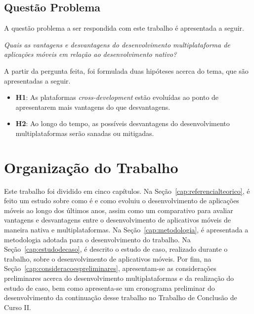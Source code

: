 \subsection{Questão Problema} \label{sec:questaoproblema}

A questão problema a ser respondida com este trabalho é apresentada a seguir.

\begin{center}
    \textit{Quais as vantagens e desvantagens do desenvolvimento multiplataforma de aplicações móveis em relação ao desenvolvimento nativo?}
\end{center}

A partir da pergunta feita, foi formulada duas hipóteses acerca do tema, que são apresentadas a seguir.

\begin{itemize}
    \item \textbf{H1}: As plataformas \textit{cross-development} estão evoluídas ao ponto de apresentarem mais vantagens do que desvantagens.
    \item \textbf{H2}: Ao longo do tempo, as possíveis desvantagens do desenvolvimento multiplataformas serão sanadas ou mitigadas.
\end{itemize}

\section{Organização do Trabalho}\label{sec:organizacao}

Este trabalho foi dividido em cinco capítulos. %
Na Seção~\ref{cap:referencialteorico}, é feito um estudo sobre como é e como evoluiu o desenvolvimento de aplicações 
móveis ao longo dos últimos anos, assim como um comparativo para avaliar vantagens e desvantagens entre o desenvolvimento 
de aplicativos móveis de maneira nativa e multiplataformas. 
Na Seção~\ref{cap:metodologia}, é apresentada a metodologia adotada para o desenvolvimento do trabalho.  
Na Seção~\ref{cap:estudodecaso}, é descrito o estudo de caso, realizado durante o trabalho, sobre o desenvolvimento de aplicativos móveis.
Por fim, na Seção~\ref{cap:consideracoespreliminares}, apresentam-se as considerações preliminares acerca do desenvolvimento multiplataformas e da realização do estudo de caso, bem como apresenta-se um 
cronograma preliminar do desenvolvimento da continuação desse trabalho no Trabalho de Conclusão de Curso II. 